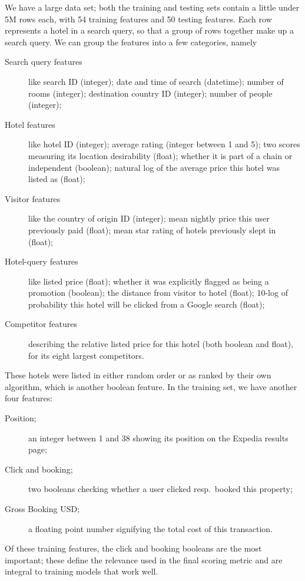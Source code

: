 \documentclass[runningheads,a4paper]{llncs}
\begin{document}
We have a large data set; both the training and testing sets contain a little under 
5M rows each, with 54 training features and 50 testing features.  Each row 
represents a hotel in a search query, so that a group of rows together make up a 
search query. We can group the features into a few categories, namely
\begin{description}
	\item[Search query features] like 
    search ID (integer); 
    date and time of search (datetime); 
    number of rooms (integer); 
    destination country ID (integer); 
    number of people (integer);
  \item[Hotel features] like 
    hotel ID (integer); 
    average rating (integer between 1 and 5); 
    two scores measuring its location desirability (float); 
    whether it is part of a chain or independent (boolean);
    natural log of the average price this hotel was listed as (float);
  \item[Visitor features] like 
    the country of origin ID (integer); 
    mean nightly price this user previously paid (float); 
    mean star rating of hotels previously slept in (float);
  \item[Hotel-query features] like 
    listed price (float); 
    whether it was explicitly flagged as being a promotion (boolean); 
    the distance from visitor to hotel (float);
    10-log of probability this hotel will be clicked from a Google search (float);
  \item[Competitor features] describing the relative listed price for this hotel 
    (both boolean and float), for its eight largest competitors.
\end{description}

These hotels were listed in either random order or as ranked by their own 
algorithm, which is another boolean feature. In the training set, we have another 
four features:
\begin{description}
	\item[Position;] an integer between 1 and 38 showing its position on the Expedia results page;
    \item[Click and booking;] two booleans checking whether a user clicked resp.~booked this property;
    \item[Gross Booking USD;] a floating point number signifying the total cost of this transaction.
\end{description}
Of these training features, the click and booking booleans are the most important; 
these define the relevance used in the final scoring metric and are integral to 
training models that work well. 
\end{document}
